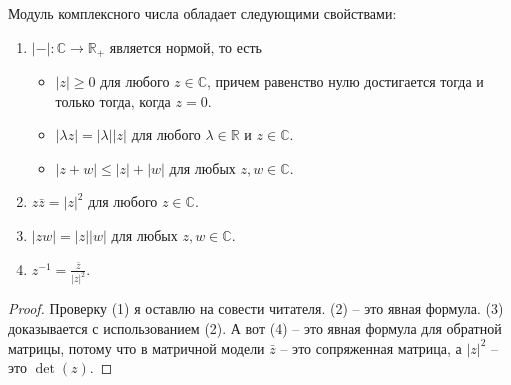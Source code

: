\begin{claim*}
Модуль комплексного числа обладает следующими свойствами:
\begin{enumerate}
\item $|{-}|\colon \mathbb C\to \mathbb R_+$ является нормой, то есть 
\begin{itemize}
\item $|z| \geqslant 0$ для любого $z\in\mathbb C$, причем равенство нулю достигается тогда и только тогда, когда $z = 0$.
\item $|\lambda z| = |\lambda | |z|$ для любого $\lambda \in \mathbb R$ и $z\in\mathbb C$.
\item $|z + w|\leqslant |z| + |w|$ для любых $z,w\in\mathbb C$.
\end{itemize}
\item $z\bar z = |z|^2$ для любого $z\in\mathbb C$.
\item $|zw| = |z| |w|$ для любых $z,w\in\mathbb C$.
\item $z^{-1} = \frac{\bar z}{|z|^2}$.
\end{enumerate}
\end{claim*}
\begin{proof}
Проверку (1) я оставлю на совести читателя. (2) -- это явная формула. (3) доказывается с использованием (2). А вот (4) -- это явная формула для обратной матрицы, потому что в матричной модели $\bar z$ -- это сопряженная матрица, а $|z|^2$ -- это $\det (z)$.
\end{proof}

